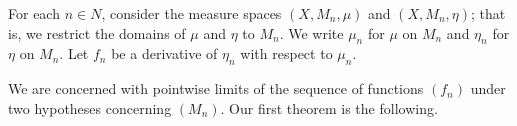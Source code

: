 For each $n \in N$, consider the measure spaces $(X, M_n, \mu)$ and $(X, M_n, \eta)$; that is, we restrict the domains of $\mu$ and $\eta$ to $M_n$. We write $\mu_n$ for $\mu$ on $M_n$ and $\eta_n$ for $\eta$ on $M_n$. Let $f_n$ be a derivative of $\eta_n$ with respect to $\mu_n$.

We are concerned with pointwise limits of the sequence of functions $(f_n)$ under two hypotheses concerning $(M_n)$. Our first theorem is the following.